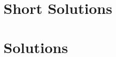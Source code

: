 \begin{enumerate}[resume]

	


	






 \clearpage

 \section{Short Solutions}


\printshortsolutions

 \clearpage

 \section{Solutions}


 \printsolutions






\end{enumerate}
